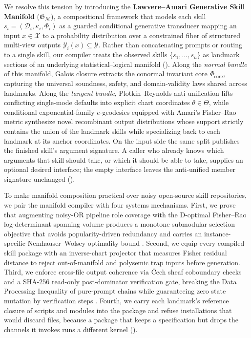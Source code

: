 \documentclass[11pt]{article}
\theoremstyle{definition}
\theoremstyle{plain}
\newcommand{\Xcal}{\mathcal{X}}
\newcommand{\Ycal}{\mathcal{Y}}
\newcommand{\Dcal}{\mathcal{D}}
\newcommand{\Mcal}{\mathcal{M}}
\newcommand{\Gfrak}{\mathfrak{G}}
\newcommand{\Phicore}{\Phi_{\mathrm{core}}}
\begin{document}
We resolve this tension by introducing the \textbf{Lawvere--Amari Generative Skill Manifold} ($\Gfrak_{\Mcal}$), a compositional framework that models each skill $s_i = (\Dcal_i, \kappa_i, \Phi_i)$ as a guarded conditional generative transducer mapping an input $x \in \Xcal$ to a probability distribution over a constrained fiber of structured multi-view outputs $\Ycal_i(x) \subseteq \Ycal$. Rather than concatenating prompts or routing to a single skill, our compiler treats the observed skills $\{s_1, \dots, s_n\}$ as landmark sections of an underlying statistical--logical manifold (). Along the \emph{normal bundle} of this manifold, Galois closure extracts the conormal invariant core $\Phicore$, capturing the universal soundness, safety, and domain-validity laws shared across landmarks. Along the \emph{tangent bundle}, Plotkin--Reynolds anti-unification lifts conflicting single-mode defaults into explicit chart coordinates $\theta \in \Theta$, while conditional exponential-family $e$-geodesics equipped with Amari's Fisher--Rao metric \citep{amari1985differential,amari2016information} synthesize novel recombinant output distributions whose support strictly contains the union of the landmark skills while specializing back to each landmark at its anchor coordinates. On the input side the same split publishes the finished skill's argument signature. A caller who already knows which arguments that skill should take, or which it should be able to take, supplies an optional desired interface; the empty interface leaves the anti-unified member signature unchanged ().

To make manifold composition practical over noisy open-source skill repositories, we pair the manifold compiler with four systems mechanisms. First, we prove that augmenting noisy-OR pipeline role coverage with the D-optimal Fisher--Rao log-determinant spanning volume produces a monotone submodular selection objective that avoids popularity-driven redundancy and carries an instance-specific Nemhauser--Wolsey optimality bound \citep{nemhauser1978analysis}. Second, we equip every compiled skill package with an inverse-chart projector that measures Fisher residual distance to reject out-of-manifold and polysemic trap inputs before generation. Third, we enforce cross-file output coherence via \v{C}ech sheaf coboundary checks and a SHA-256 read-only post-dominator verification gate, breaking the Data Processing Inequality of pure-prompt chains \citep{cover2006elements} while guaranteeing zero state mutation by verification steps \citep{reynolds2002separation}. Fourth, we carry each landmark's reference closure of scripts and modules into the package and refuse installations that would discard files, because a package that keeps a specification but drops the channels it invokes runs a different kernel ().
\end{document}
